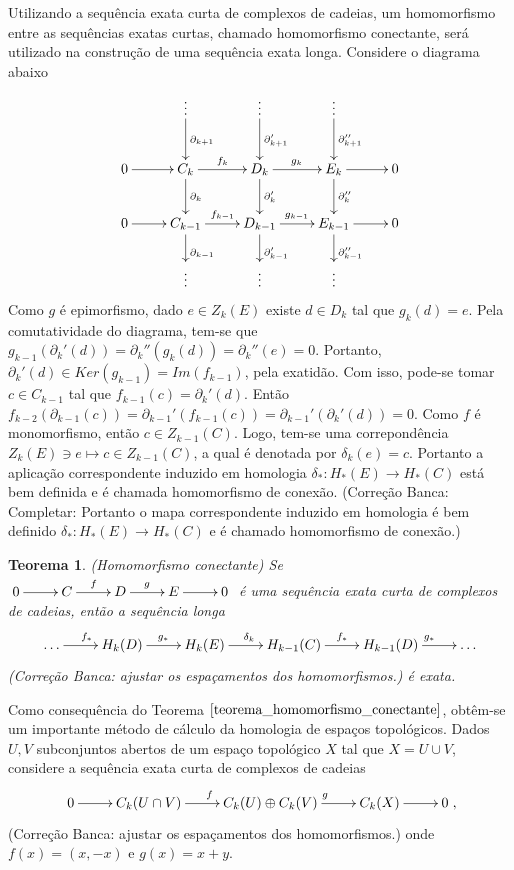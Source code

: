 \documentclass[12pt]{book}
\newtheorem{teorema}{Teorema}[section]
\newcommand{\bordo}[1]{\partial_{#1}}
\newcommand{\homologiaabrev}[2]{H_{#1}(#2)}
\newcommand{\kernelbordoabrev}[2]{Z_{#1}(#2)}
\newcommand{\alerta}[1]{{\color{red}#1}}
\newcommand{\correcaobanca}[1]{\alerta{(Correção Banca: #1)}}
\begin{document}
	Utilizando a sequência exata curta de complexos de cadeias, um homomorfismo entre as sequências exatas curtas, chamado homomorfismo conectante, será utilizado na construção de uma sequência exata longa. Considere o diagrama abaixo
	$$
	\xymatrix{
		 & \vdots \ar[d]^{\bordo{k+1}} & \vdots \ar[d]^{\bordo{k+1}'} & \vdots \ar[d]^{\bordo{k+1}''}& 
		\\
		0 \ar[r] & C_{k}\ar[d]^{\bordo{k}}\ar[r]^{f_{k}} & D_{k}\ar[d]^{\bordo{k}'}\ar[r]^{g_{k}} & E_{k} \ar[d]^{\bordo{k}''}\ar[r]& 0
		\\
		0 \ar[r] & C_{k-1}\ar[d]^{\bordo{k-1}}\ar[r]^{f_{k-1}} & D_{k-1}\ar[d]^{\bordo{k-1}'}\ar[r]^{g_{k-1}} & E_{k-1}\ar[d]^{\bordo{k-1}''} \ar[r]& 0
		\\
		 & \vdots & \vdots  & \vdots & 
	}
	$$
	Como $g$ é epimorfismo, dado $e \in \kernelbordoabrev{k}{E}$ existe $d \in D_{k}$ tal que $g_{k}(d) = e$. Pela comutatividade do diagrama, tem-se que $g_{k-1}(\bordo{k}'(d)) = \bordo{k}''(g_{k}(d)) = \bordo{k}''(e) = 0$. Portanto, $\bordo{k}'(d) \in Ker(g_{k-1}) = Im(f_{k-1})$, pela exatidão. Com isso, pode-se tomar $c \in C_{k-1}$ tal que $f_{k-1}(c)=\bordo{k}'(d)$. Então $f_{k-2}(\bordo{k-1}(c)) = \bordo{k-1}'(f_{k-1}(c)) = \bordo{k-1}'(\bordo{k}'(d)) = 0$. Como $f$ é monomorfismo, então $c\in \kernelbordoabrev{k-1}{C}$. Logo, tem-se uma correpondência $\kernelbordoabrev{k}{E} \ni e \mapsto c \in \kernelbordoabrev{k-1 }{C}$, a qual é denotada por $\delta_{k}(e) = c$. Portanto a aplicação correspondente induzido em homologia $\delta_{*}:H_{*}(E) \to H_{*}(C)$ está bem definida e é chamada homomorfismo de conexão. \correcaobanca{Completar: Portanto o mapa correspondente induzido em homologia é bem definido $\delta_{*}:H_{*}(E) \to H_{*}(C)$ e é chamado homomorfismo de conexão.}
	
	\begin{teorema}\label{teorema_homomorfismo_conectante}
		(Homomorfismo conectante) Se $ \xymatrix{0 \ar[r] & C\ar[r]^{f} & D\ar[r]^{g} & E \ar[r]& 0}$ é uma sequência exata curta de complexos de cadeias, então a sequência longa 
		$$
		\xymatrix{\dots \ar[r]^{f_{*}} & \homologiaabrev{k}{D}\ar[r]^{g_{*}} & \homologiaabrev{k}{E}\ar[r]^{\delta_{k}}& \homologiaabrev{k-1}{C}\ar[r]^{f_{*}} & \homologiaabrev{k-1}{D} \ar[r]^{g_{*}}& \dots} 
		$$
		\correcaobanca{ajustar os espaçamentos dos homomorfismos.}
		é exata.
	\end{teorema}
	
	Como consequência do Teorema $\ref{teorema_homomorfismo_conectante}$, obtêm-se um importante método de cálculo da homologia de espaços topológicos. Dados $U, V$ subconjuntos abertos de um espaço topológico $X$ tal que $X = U\cup V$, considere a sequência exata curta de complexos de cadeias
	$$ 
	\xymatrix{0 \ar[r] & C_{k}(U\cap V)\ar[r]^{f} & C_{k}(U)\oplus C_{k}(V)\ar[r]^{g} & C_{k}(X) \ar[r]& 0},
	$$
		\correcaobanca{ajustar os espaçamentos dos homomorfismos.}
	onde $f(x) = (x,-x)$ e $g(x) = x+y$.
	
\end{document}
